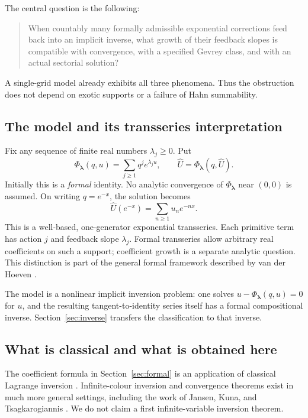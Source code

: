 \documentclass[11pt,a4paper]{article}
\numberwithin{equation}{section}
\theoremstyle{definition}
\theoremstyle{remark}
\newcommand{\lam}{\boldsymbol\lambda}
\newcommand{\PhiL}{\Phi_{\lam}}
\newcommand{\Uhat}{\widehat U}
\begin{document}
The central question is the following:
\begin{quote}
When countably many formally admissible exponential corrections feed back
into an implicit inverse, what growth of their feedback slopes is compatible
with convergence, with a specified Gevrey class, and with an actual
sectorial solution?
\end{quote}
A single-grid model already exhibits all three phenomena.  Thus the
obstruction does not depend on exotic supports or a failure of Hahn
summability.

\subsection{The model and its transseries interpretation}

Fix any sequence of finite real numbers $\lambda_j\ge0$.  Put
\begin{equation}
 \PhiL(q,u)=\sum_{j\ge1}q^j e^{\lambda_j u},
 \qquad \Uhat=\PhiL(q,\Uhat).
 \label{eq:kernel}
\end{equation}
Initially this is a \emph{formal} identity.  No analytic convergence of
$\PhiL$ near $(0,0)$ is assumed.  On writing $q=e^{-x}$, the solution becomes
\begin{equation}
 \Uhat(e^{-x})=\sum_{n\ge1}u_n e^{-nx}.
 \label{eq:transseries}
\end{equation}
This is a well-based, one-generator exponential transseries.  Each primitive
term has action $j$ and feedback slope $\lambda_j$.  Formal transseries
allow arbitrary real coefficients on such a support; coefficient growth
is a separate analytic question.  This distinction is part of the general
formal framework described by van der Hoeven \cite{vdh}.

The model is a nonlinear implicit inversion problem: one solves
$u-\PhiL(q,u)=0$ for $u$, and the resulting tangent-to-identity series itself
has a formal compositional inverse.  Section~\ref{sec:inverse} transfers the
classification to that inverse.

\subsection{What is classical and what is obtained here}

The coefficient formula in Section~\ref{sec:formal} is an application of
classical Lagrange inversion \cite{gessel}.  Infinite-colour inversion and
convergence theorems exist in much more general settings, including the
work of Jansen, Kuna, and Tsagkarogiannis \cite{jktcolors,jktvirial}.
We do not claim a first infinite-variable inversion theorem.
\end{document}
